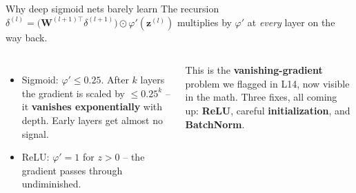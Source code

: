 \documentclass[aspectratio=169]{beamer}
\begin{document}
\begin{frame}{Why deep sigmoid nets barely learn}
  The recursion $\delta^{(l)} = \big(\mathbf{W}^{(l+1)\top}\delta^{(l+1)}\big)\odot
  \varphi'(\mathbf{z}^{(l)})$ multiplies by $\varphi'$ at \emph{every} layer on the way back.
  \vfill
  \begin{columns}[T]
    \begin{itemize}\small
      \item Sigmoid: $\varphi' \le 0.25$. After $k$ layers the gradient is scaled by
        $\le 0.25^{k}$ -- it \textbf{vanishes exponentially} with depth. Early layers get
        almost no signal.
      \item ReLU: $\varphi' = 1$ for $z>0$ -- the gradient passes through undiminished.
    \end{itemize}
    \vskip 4pt
    This is the \textbf{vanishing-gradient} problem we flagged in L14, now visible in the math.
    Three fixes, all coming up: \textbf{ReLU}, careful \textbf{initialization}, and
    \textbf{BatchNorm}.
  \end{columns}
\end{frame}
\end{document}
